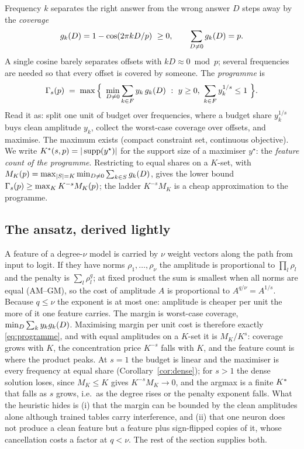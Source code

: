 Frequency $k$ separates the right answer from the wrong answer $D$ steps away by the
\emph{coverage}
\begin{equation}
  g_{k}(D)=1-\cos(2\pi kD/p)\ \ge 0,\qquad \sum_{D\neq 0}g_{k}(D)=p .
\end{equation}
A single cosine barely separates offsets with $kD\approx 0 \bmod p$; several frequencies are needed
so that every offset is covered by someone. The \emph{programme} is
\begin{equation}
  \Gamma_s(p)\;=\;\max\Big\{\ \min_{D\neq 0}\sum_{k\in F} y_k\,g_{k}(D)\ :\ y\ge 0,\ \sum_{k\in F} y_k^{1/s}\le 1\ \Big\}.
  \label{eq:programme}
\end{equation}
Read it as: split one unit of budget over frequencies, where a budget share $y_k^{1/s}$ buys clean
amplitude $y_k$, collect the worst-case coverage over offsets, and maximise. The maximum exists (compact
constraint set, continuous objective). We write $K^{*}(s,p)=|\operatorname{supp}(y^\star)|$ for the support size of a
maximiser $y^\star$: the \emph{feature count of the programme}. Restricting to equal shares on a $K$-set,
with $M_K(p)=\max_{|S|=K}\min_{D\neq 0}\sum_{k\in S}g_{k}(D)$, gives the lower bound
$\Gamma_s(p)\ge\max_K K^{-s}M_K(p)$; the ladder $K^{-s}M_K$ is a cheap approximation to the programme.

\subsection{The ansatz, derived lightly}
\label{sec:ansatz}

A feature of a degree-$\nu$ model is carried by $\nu$ weight vectors along the path from input to
logit. If they have norms $\rho_1,\dots,\rho_\nu$ the amplitude is proportional to $\prod_l\rho_l$ and
the penalty is $\sum_l\rho_l^q$; at fixed product the sum is smallest when all norms are equal
(AM--GM), so the cost of amplitude $A$ is proportional to $A^{q/\nu}=A^{1/s}$. Because $q\le\nu$ the
exponent is at most one: amplitude is cheaper per unit the more of it one feature carries. The
margin is worst-case coverage, $\min_D\sum_k y_kg_{k}(D)$. Maximising margin per unit cost is
therefore exactly \eqref{eq:programme}, and with equal amplitudes on a $K$-set it is $M_K/K^s$:
coverage grows with $K$, the concentration price $K^{-s}$ falls with $K$, and the feature count is
where the product peaks. At $s=1$ the budget is linear and the maximiser is every frequency at equal
share (Corollary~\ref{cor:dense}); for $s>1$ the dense solution loses, since $M_K\le K$ gives
$K^{-s}M_K\to 0$, and the argmax is a finite $K^{*}$ that falls as $s$ grows, i.e.\ as the degree
rises or the penalty exponent falls. What the heuristic hides is (i) that the margin can be bounded by
the clean amplitudes alone although trained tables carry interference, and (ii) that one neuron does not
produce a clean feature but a feature plus sign-flipped copies of it, whose cancellation costs a
factor at $q<\nu$. The rest of the section supplies both.


